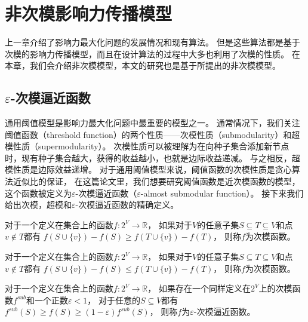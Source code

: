 
\chapter{非次模影响力传播模型}
上一章介绍了影响力最大化问题的发展情况和现有算法。
但是这些算法都是基于次模的影响力传播模型，而且在设计算法的过程中大多也利用了次模的性质。
在本章，我们会介绍非次模模型，本文的研究也是基于所提出的非次模模型。

\section{$\varepsilon$-次模逼近函数}
通用阈值模型是影响力最大化问题中最重要的模型之一。
通常情况下，我们关注阈值函数（threshold function）的两个性质——次模性质（submodularity）和超模性质（supermodularity）。
次模性质可以被理解为在向种子集合添加新节点时，现有种子集合越大，获得的收益越小，也就是边际收益递减。
与之相反，超模性质是边际效益递增。
对于通用阈值模型来说，阈值函数的次模性质是贪心算法近似比的保证\cite{Mossel2007sub}，
在这篇论文里，我们想要研究阈值函数是近次模函数的模型，这个函数被定义为$\varepsilon$-次模逼近函数（$\varepsilon$-almost submodular function）。
接下来我们给出次模，超模和$\varepsilon$-次模逼近函数的精确定义。

\begin{definition}[次模 (Submodular)]
对于一个定义在集合上的函数$f:2^V \to \mathbb{R}$，
如果对于$V$的任意子集$S \subseteq T \subseteq V$和点$v \not\in T$都有
$f(S \cup \{v\}) - f(S) \geq f(T \cup \{v\}) - f(T)$，
则称$f$为次模函数。
\end{definition}

\begin{definition}[超模 (Supermodular)]
对于一个定义在集合上的函数$f:2^V \to \mathbb{R}$，
如果对于$V$的任意子集$S \subseteq T \subseteq V$和点$v \not\in T$都有
$f(S \cup \{v\}) - f(S) \leq f(T \cup \{v\}) - f(T)$，
则称$f$为次模函数。
\end{definition}

\begin{definition}
对于一个定义在集合上的函数$f:2^V \to \mathbb{R}$，
如果存在一个同样定义在$2^V$上的次模函数$f^{sub}$和一个正数$\varepsilon<1$，
对于任意的$S \subseteq V$都有$f^{sub}(S) \geq f(S) \geq (1-\varepsilon)f^{sub}(S)$，
则称$f$为$\varepsilon$-次模逼近函数。
\end{definition}

